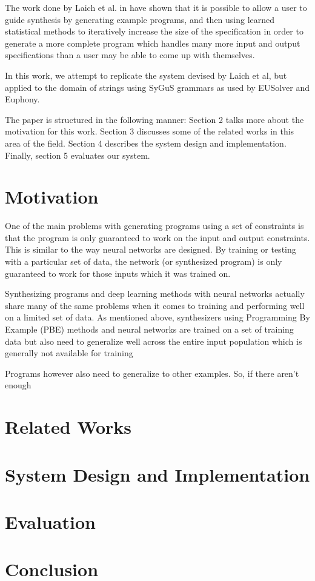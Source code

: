 \documentclass[sigconf,authordraft]{acmart}
\begin{document}
The work done by Laich et al. in \cite{laich2020guiding} have shown that it is
possible to allow a user to guide synthesis by generating example programs,
and then using learned statistical methods to iteratively increase the size
of the specification in order to generate a more complete program which handles
many more input and output specifications than a user may be able to come up
with themselves.

In this work, we attempt to replicate the system devised by Laich et al, but
applied to the domain of strings using SyGuS grammars as used by EUSolver and
Euphony.

The paper is structured in the following manner: Section 2 talks more about the
motivation for this work. Section 3 discusses some of the related works in this
area of the field. Section 4 describes the system design and implementation.
Finally, section 5 evaluates our system.

\section{Motivation}


One of the main problems with generating programs using a set of constraints is
that the program is only guaranteed to work on the input and output constraints.
This is similar to the way neural networks are designed. By training or testing
with a particular set of data, the network (or synthesized program) is only
guaranteed to work for those inputs which it was trained on.

Synthesizing programs and deep learning methods with neural networks actually
share many of the same problems when it comes to training and performing well on
a limited set of data. As mentioned above, synthesizers using Programming By
Example (PBE) methods and neural networks are trained on a set of training data
but also need to generalize well across the entire input population which is
generally not available for training

Programs however also need to generalize to other examples. So, if there aren't
enough


\section{Related Works}

\section{System Design and Implementation}

\section{Evaluation}

\section{Conclusion}



\end{document}
